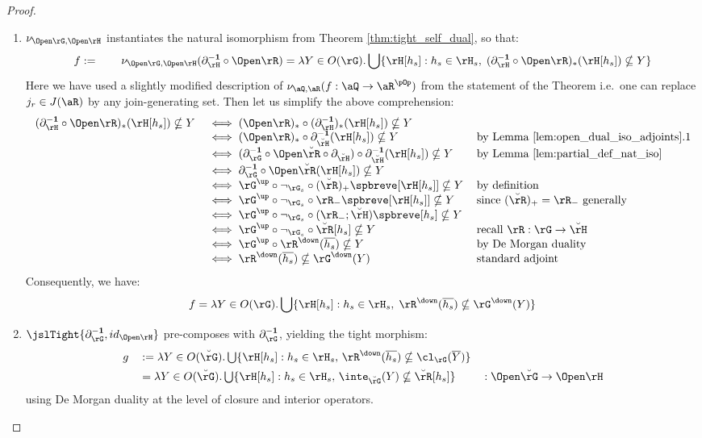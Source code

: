 \documentclass{article}
\begin{document}
\begin{proof}
\begin{enumerate}
\item
$\nu_{\Open\rG,\Open\rH}$ instantiates the natural isomorphism from Theorem \ref{thm:tight_self_dual}, so that:
\[
f := \qquad
\nu_{\Open\rG,\Open\rH}(\partial_\rH^{\bf-1} \circ \Open\rR)
= \lambda Y \in O(\rG). \bigcup \{ \rH[h_s] : h_s \in \rH_s, \; (\partial_\rH^{\bf-1} \circ \Open\rR)_*(\rH[h_s]) \nsubseteq Y \}
\]
Here we have used a slightly modified description of $\nu_{\aQ,\aR}(f : \aQ \to \aR^{\pOp})$ from the statement of the Theorem i.e.\ one can replace $j_r \in J(\aR)$ by any join-generating set. Then let us simplify the above comprehension:
\[
\begin{tabular}{lll}
$(\partial_\rH^{\bf-1} \circ \Open\rR)_*(\rH[h_s]) \nsubseteq Y$
&
$\iff (\Open\rR)_* \circ (\partial_\rH^{\bf-1})_*(\rH[h_s]) \nsubseteq Y$
\\&
$\iff (\Open\rR)_* \circ \partial_{\breve{\rH}}^{\bf-1}(\rH[h_s]) \nsubseteq Y$
& by Lemma \ref{lem:open_dual_iso_adjoints}.1
\\&
$\iff (\partial_\rG^{\bf-1} \circ \Open\breve{\rR} \circ \partial_{\breve{\rH}} ) \circ \partial_{\breve{\rH}}^{\bf-1}(\rH[h_s]) \nsubseteq Y$
& by Lemma \ref{lem:partial_def_nat_iso}
\\&
$\iff \partial_\rG^{\bf-1} \circ \Open\breve{\rR}(\rH[h_s]) \nsubseteq Y$
\\&
$\iff \rG^\up \circ \neg_{\rG_s} \circ (\breve{\rR})_+\spbreve[\rH[h_s]] \nsubseteq Y$
& by definition
\\&
$\iff \rG^\up \circ \neg_{\rG_s} \circ \rR_-\spbreve[\rH[h_s]] \nsubseteq Y$
& since $(\breve{\rR})_+ = \rR_-$ generally
\\&
$\iff \rG^\up \circ \neg_{\rG_s} \circ (\rR_- ; \breve{\rH})\spbreve[h_s] \nsubseteq Y$
\\&
$\iff \rG^\up \circ \neg_{\rG_s} \circ \breve{\rR}[h_s] \nsubseteq Y$
& recall $\rR : \rG \to \breve{\rH}$
\\&
$\iff \rG^\up \circ \rR^\down(\overline{h_s}) \nsubseteq Y$
& by De Morgan duality
\\&
$\iff \rR^\down(\overline{h_s}) \nsubseteq \rG^\down(Y)$
& standard adjoint
\end{tabular}
\]
Consequently, we have:
\[
f = \lambda Y \in O(\rG). \bigcup \{ \rH[h_s] : h_s \in \rH_s, \; \rR^\down(\overline{h_s}) \nsubseteq \rG^\down(Y) \}
\]

\item
$\jslTight{\partial_\rG^{\bf-1},id_{\Open\rH}}$ pre-composes with $\partial_\rG^{\bf-1}$, yielding the tight morphism:
\[
\begin{tabular}{lll}
$g$
& $:= \lambda Y \in O(\breve{\rG}). \bigcup \{ \rH[h_s] : h_s \in \rH_s, \, \rR^\down(\overline{h_s}) \nsubseteq \cl_\rG(\overline{Y}) \}$
\\[1ex]
& $= \lambda Y \in O(\breve{\rG}). \bigcup \{ \rH[h_s] : h_s \in \rH_s, \, \inte_{\breve{\rG}}(Y) \nsubseteq \breve{\rR}[h_s]  \}$
&  $: \Open\breve{\rG} \to \Open\rH$
\end{tabular}
\]
using De Morgan duality at the level of closure and interior operators.


\end{enumerate}
\end{proof}
\end{document}

